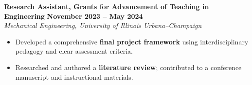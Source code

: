 \documentclass[10pt]{article}
\begin{document}
	\textbf{Research Assistant, Grants for Advancement of Teaching in Engineering} \hfill \textbf{November 2023 -- May 2024} \\
	\emph{Mechanical Engineering, University of Illinois Urbana–Champaign}
	\begin{itemize}
		\item Developed a comprehensive \textbf{final project framework} using interdisciplinary pedagogy and clear assessment criteria.
		\item Researched and authored a \textbf{literature review}; contributed to a conference manuscript and instructional materials.
	\end{itemize}
	
\end{document}
